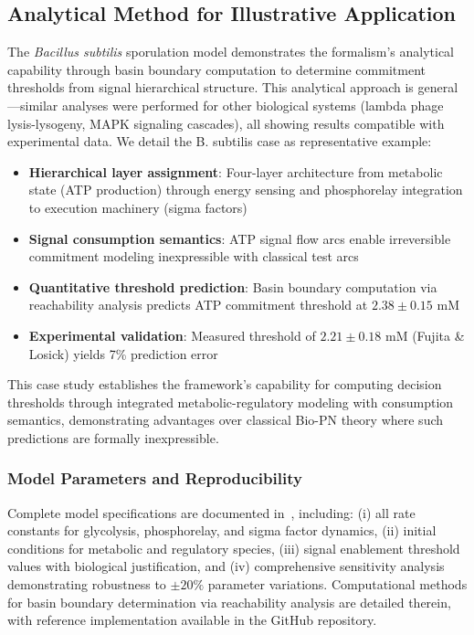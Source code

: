 \documentclass[10pt,letterpaper]{article}
\begin{document}
\subsection{Analytical Method for Illustrative Application}

The \textit{Bacillus subtilis} sporulation model demonstrates the formalism's analytical capability through basin boundary computation to determine commitment thresholds from signal hierarchical structure. This analytical approach is general---similar analyses were performed for other biological systems (lambda phage lysis-lysogeny, MAPK signaling cascades), all showing results compatible with experimental data. We detail the B. subtilis case as representative example:

\begin{itemize}
\item \textbf{Hierarchical layer assignment}: Four-layer architecture from metabolic state (ATP production) through energy sensing and phosphorelay integration to execution machinery (sigma factors)
\item \textbf{Signal consumption semantics}: ATP signal flow arcs enable irreversible commitment modeling inexpressible with classical test arcs
\item \textbf{Quantitative threshold prediction}: Basin boundary computation via reachability analysis predicts ATP commitment threshold at $2.38 \pm 0.15$ mM
\item \textbf{Experimental validation}: Measured threshold of $2.21 \pm 0.18$ mM (Fujita \& Losick) yields 7\% prediction error
\end{itemize}

This case study establishes the framework's capability for computing decision thresholds through integrated metabolic-regulatory modeling with consumption semantics, demonstrating advantages over classical Bio-PN theory where such predictions are formally inexpressible.

\subsubsection{Model Parameters and Reproducibility}

Complete model specifications are documented in~\cite{subtilis2026}, including: (i) all rate constants for glycolysis, phosphorelay, and sigma factor dynamics, (ii) initial conditions for metabolic and regulatory species, (iii) signal enablement threshold values with biological justification, and (iv) comprehensive sensitivity analysis demonstrating robustness to $\pm 20\%$ parameter variations. Computational methods for basin boundary determination via reachability analysis are detailed therein, with reference implementation available in the GitHub repository.
\end{document}
